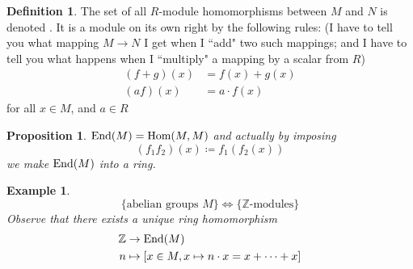 \documentclass[12pt]{article}
\newcommand{\z}{\mathbb{Z}}
\newcommand{\ita}[1]{\textit{#1}}
\newcommand{\ho}[2]{\textup{Hom}(#1,#2)}
\newcommand{\en}[1]{\textup{End}(#1)}
\newcommand\en{\ita{n }}
\newtheorem{prop}[theorem]{Proposition}
\newtheorem*{eg}{Example}
\theoremstyle{definition}
\newtheorem{definition}[theorem]{Definition}
\begin{document}
\begin{definition}
The set of all $R$-module homomorphisms between $M$ and $N$ is denoted \boldsymbol{\ho{M}{N}}. It is a module on its own right by the following rules: (I have to tell you what mapping $M\rightarrow N$ I get when I ``add" two such mappings; and I have to tell you what happens when I ``multiply" a mapping by a scalar from $R$)
\begin{align*}
    (f+g)(x) &= f(x) + g(x)\\
    (af)(x) &= a\cdot f(x)
\end{align*}
for all $x\in M$, and $a\in R$
\end{definition}
\begin{prop}
$\en{M} = \ho{M}{M}$ and actually by imposing\[
(f_1f_2)(x) \coloneqq f_1(f_2(x))
\]
we make $\en{M}$ into a ring.
\end{prop}


\begin{eg}
\[
\{\text{abelian groups $M$}\} \iff \{\z\text{-modules}\}
\]
Observe that there exists a unique ring homomorphism
\begin{align*}
\z &\to \en{M}\\
n & \mapsto [x\in M, x\mapsto n\cdot x = x+\dots +x]
\end{align*}
\end{eg}
\end{document}
